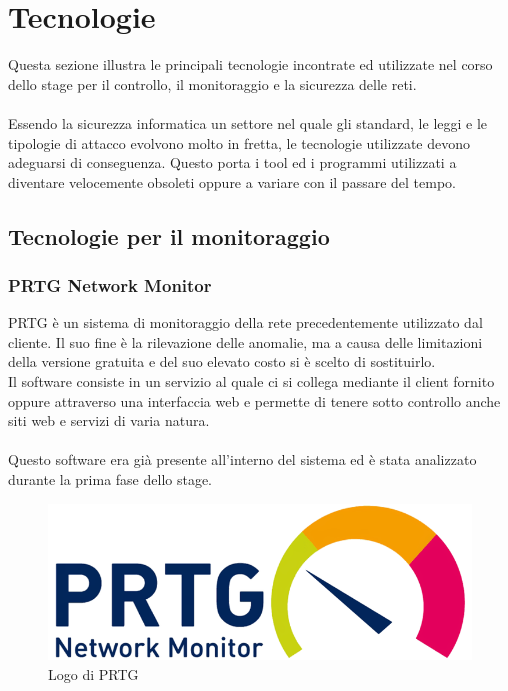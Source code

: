 \documentclass[Tesi.tex]{subfiles}
\begin{document}
\chapter{Tecnologie}

Questa sezione illustra le principali tecnologie incontrate ed utilizzate nel corso dello stage per il controllo, il monitoraggio e la sicurezza delle reti. \\\\
Essendo la sicurezza informatica un settore nel quale gli standard, le leggi e le tipologie di attacco evolvono molto in fretta, le tecnologie utilizzate devono adeguarsi di conseguenza. Questo porta i tool ed i programmi utilizzati a diventare velocemente obsoleti oppure a variare con il passare del tempo.

\section{Tecnologie per il monitoraggio}
\subsection{PRTG Network Monitor}
PRTG è un sistema di monitoraggio della rete precedentemente utilizzato dal cliente. Il suo fine è la rilevazione delle anomalie, ma a causa delle limitazioni della versione gratuita e del suo elevato costo si è scelto di sostituirlo.\\
Il software consiste in un servizio al quale ci si collega mediante il client fornito oppure attraverso una interfaccia web e permette di tenere sotto controllo anche siti web e servizi di varia natura.\\\\
Questo software era già presente all'interno del sistema ed è stata analizzato durante la prima fase dello stage.
\begin{figure}[H]
	\centering
	\includegraphics[width=0.35\linewidth]{"images/logo/PRTG_logo"}
	\caption{Logo di PRTG}
	\label{fig:Logo di PRTG}
\end{figure}
\end{document}
